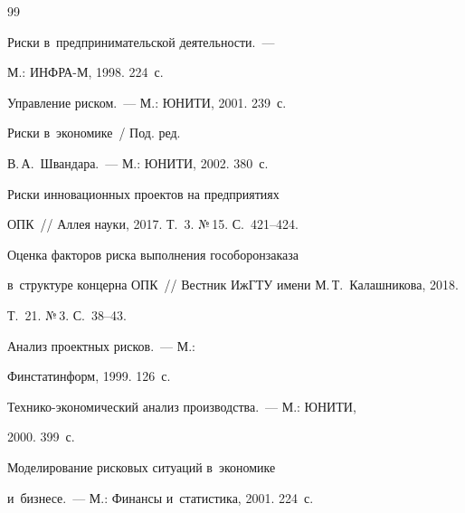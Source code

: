      


{\small\frenchspacing


{%




\begin{thebibliography}{99}




 Риски в~предпринимательской деятельности.~--- 


М.: ИНФРА-М, 1998. 224~с. 







 Управление риском.~--- М.: ЮНИТИ, 2001. 239~с. 







 Риски в~экономике~/ Под. ред. 


В.\,А.~Швандара.~--- М.: ЮНИТИ, 2002. 380~с. 







 Риски инновационных проектов на предприятиях 


ОПК~/\!\!/ Аллея науки, 2017. Т.~3. №\,15. С.~421--424.




 Оценка факторов риска выполнения гособоронзаказа 


в~структуре концерна ОПК~/\!\!/ Вестник ИжГТУ имени М.\,Т.~Калашникова, 2018. 


Т.~21. №\,3. С.~38--43.




 Анализ проектных рисков.~--- М.: 


Финстатинформ, 1999. 126~с.




 Технико-эко\-но\-ми\-че\-ский анализ производства.~--- М.: ЮНИТИ, 


2000. 399~с. 




 Моделирование рисковых ситуаций в~экономике 


и~бизнесе.~--- М.: Финансы и~статистика, 2001. 224~с.



\end{thebibliography}}}
